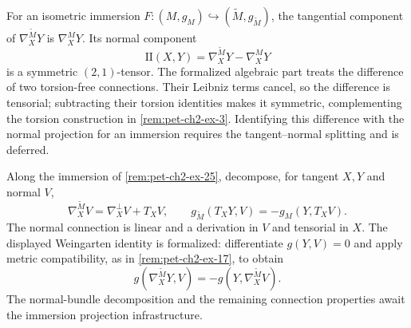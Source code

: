 \begin{remark}
  \label{rem:pet-ch2-ex-25}
  \leanok
  For an isometric immersion
  $F:(M,g_M)\hookrightarrow(\widetilde M,g_{\widetilde M})$, the tangential
  component of $\nabla^{\widetilde M}_XY$ is $\nabla^M_XY$. Its normal
  component
  \[
    \mathrm{I\!I}(X,Y)
      =\nabla^{\widetilde M}_XY-\nabla^M_XY
  \]
  is a symmetric $(2,1)$-tensor.
  \sketch
  The formalized algebraic part treats the difference of two torsion-free
  connections. Their Leibniz terms cancel, so the difference is tensorial;
  subtracting their torsion identities makes it symmetric, complementing the
  torsion construction in \cref{rem:pet-ch2-ex-3}. Identifying this
  difference with the normal projection for an immersion requires the
  tangent--normal splitting and is deferred.
\end{remark}

\begin{remark}
  \label{rem:pet-ch2-ex-26}
  \leanok
  Along the immersion of
  \cref{rem:pet-ch2-ex-25}, decompose, for tangent $X,Y$ and normal $V$,
  \[
    \nabla^{\widetilde M}_XV=\nabla^\perp_XV+T_XV,
    \qquad
    g_{\widetilde M}(T_XY,V)=-g_M(Y,T_XV).
  \]
  The normal connection is linear and a derivation in $V$ and tensorial in
  $X$.
  \sketch
  The displayed Weingarten identity is formalized: differentiate
  $g(Y,V)=0$ and apply metric compatibility, as in
  \cref{rem:pet-ch2-ex-17}, to obtain
  \[
    g(\nabla^{\widetilde M}_XY,V)
      =-g(Y,\nabla^{\widetilde M}_XV).
  \]
  The normal-bundle decomposition and the remaining connection properties
  await the immersion projection infrastructure.
\end{remark}

